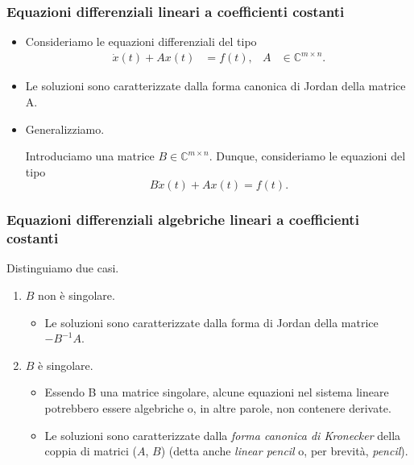 \begin{frame}
	\frametitle{Equazioni differenziali lineari a coefficienti costanti}
	\begin{itemize}
		\item Consideriamo le equazioni
		differenziali del tipo
		\begin{align*}
			\dot{x}(t) + Ax(t) &= f(t),& A &\in \mathbb{C}^{m \times n}.
		\end{align*}
		\item {} Le soluzioni sono caratterizzate dalla forma canonica
		di Jordan della matrice A.

		\item {} Generalizziamo.
	
		Introduciamo una matrice $B \in \mathbb{C}^{m \times n}$. Dunque, consideriamo
		le equazioni del tipo
		\[
			B\dot{x}(t) + Ax(t) = f(t).
		\]
	\end{itemize}
\end{frame}

\begin{frame}
	\frametitle{Equazioni differenziali algebriche lineari a coefficienti costanti}
	Distinguiamo due casi.
	\begin{enumerate}
		\item $B$ non \`e singolare.
		\begin{itemize}
			\item {} Le soluzioni sono caratterizzate dalla forma
			di Jordan della matrice $-B^{-1}A$.
		\end{itemize}
		\item {} $B$ \`e singolare.
		\begin{itemize}
			\item {} Essendo B una matrice singolare, alcune equazioni nel sistema lineare potrebbero
			essere algebriche o, in altre parole, non contenere derivate.
			\item {} Le soluzioni sono caratterizzate dalla \emph{forma canonica di
			Kronecker} della coppia di matrici ($A$, $B$) (detta anche \emph{linear pencil} o,
			per brevit\`a, \emph{pencil}).
		\end{itemize}
	\end{enumerate}
	
\end{frame}